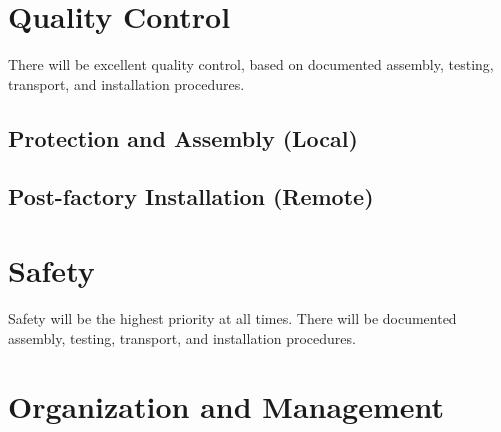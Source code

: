 \section{Quality Control}

There will be excellent quality control, based on documented assembly, testing, transport, and installation procedures.
\label{sec:fdsp-hv-qc}

\subsection{Protection and Assembly (Local)}
\label{sec:fdsp-hv-qc-local}


\subsection{Post-factory Installation (Remote)}
\label{sec:fdsp-hv-qc-remote}





\section{Safety}

Safety will be the highest priority at all times. There will be documented assembly, testing, transport, and installation procedures.

\label{sec:fdsp-hv-safety}






\section{Organization and Management}
\label{sec:fdsp-hv-org}

